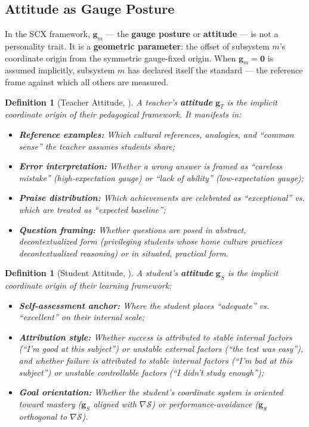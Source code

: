 \documentclass[11pt,a4paper]{article}
\newtheorem{definition}[theorem]{Definition}
\newcommand{\gradS}{\nabla\mathcal{S}}
\begin{document}
\subsection{Attitude as Gauge Posture}
In the SCX framework, $\mathbf{g}_m$ — the \textbf{gauge posture} or \textbf{attitude} — is not a personality trait. It is a \textbf{geometric parameter}: the offset of subsystem $m$'s coordinate origin from the symmetric gauge-fixed origin. When $\mathbf{g}_m = \mathbf{0}$ is assumed implicitly, subsystem $m$ has declared itself the standard — the reference frame against which all others are measured.
\begin{definition}[Teacher Attitude, \textbf{}]
\label{def:teacher_attitude}
A teacher's \textbf{attitude} $\mathbf{g}_T$ is the implicit coordinate origin of their pedagogical framework. It manifests in:
\begin{itemize}
    \item \textbf{Reference examples:} Which cultural references, analogies, and ``common sense'' the teacher assumes students share;
    \item \textbf{Error interpretation:} Whether a wrong answer is framed as ``careless mistake'' (high-expectation gauge) or ``lack of ability'' (low-expectation gauge);
    \item \textbf{Praise distribution:} Which achievements are celebrated as ``exceptional'' vs. which are treated as ``expected baseline'';
    \item \textbf{Question framing:} Whether questions are posed in abstract, decontextualized form (privileging students whose home culture practices decontextualized reasoning) or in situated, practical form.
\end{itemize}
\end{definition}
\begin{definition}[Student Attitude, \textbf{}]
\label{def:student_attitude}
A student's \textbf{attitude} $\mathbf{g}_S$ is the implicit coordinate origin of their learning framework:
\begin{itemize}
    \item \textbf{Self-assessment anchor:} Where the student places ``adequate'' vs. ``excellent'' on their internal scale;
    \item \textbf{Attribution style:} Whether success is attributed to stable internal factors (``I'm good at this subject'') or unstable external factors (``the test was easy''), and whether failure is attributed to stable internal factors (``I'm bad at this subject'') or unstable controllable factors (``I didn't study enough'');
    \item \textbf{Goal orientation:} Whether the student's coordinate system is oriented toward mastery ($\mathbf{g}_S$ aligned with $\gradS$) or performance-avoidance ($\mathbf{g}_S$ orthogonal to $\gradS$).
\end{itemize}
\end{definition}
\end{document}
